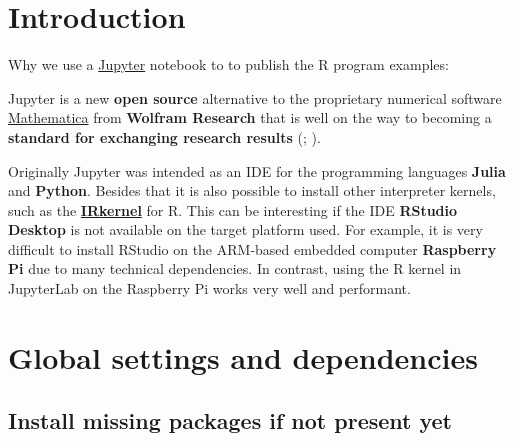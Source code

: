 \documentclass [oneside,10pt,a4paper,ngerman,BCOR10mm,headsepline,parindent,final]{scrartcl}
\begin{document}
    \newpage

    \pagestyle{fancy}
    \fancyhf{}
    \fancyhead[ER,OR]{\leftmark}

    \renewcommand{\sectionmark}[1]{
        \markboth{\thesection{} #1}{}
    }

    
    \tableofcontents
    
    


    
    \hypertarget{introduction}{%
\section{Introduction}\label{introduction}}

Why we use a
\href{https://en.wikipedia.org/wiki/Project_Jupyter}{Jupyter} notebook
to to publish the R program examples:

Jupyter is a new \textbf{open source} alternative to the proprietary
numerical software
\href{https://en.wikipedia.org/wiki/Wolfram_Mathematica}{Mathematica}
from \textbf{Wolfram Research} that is well on the way to becoming a
\textbf{standard for exchanging research results}
(\cite{Scientific_Paper_obsolete_2018};
\cite{Future_of_Research_Paper_2018}).

Originally Jupyter was intended as an IDE for the programming languages
\textbf{Julia} and \textbf{Python}. Besides that it is also possible to
install other interpreter kernels, such as the
\textbf{\href{https://irkernel.github.io/installation/}{IRkernel}} for
R. This can be interesting if the IDE \textbf{RStudio Desktop} is not
available on the target platform used. For example, it is very difficult
to install RStudio on the ARM-based embedded computer \textbf{Raspberry
Pi} due to many technical dependencies. In contrast, using the R kernel
in JupyterLab on the Raspberry Pi works very well and performant.

    \hypertarget{global-settings-and-dependencies}{%
\section{Global settings and
dependencies}\label{global-settings-and-dependencies}}

\hypertarget{install-missing-packages-if-not-present-yet}{%
\subsection{Install missing packages if not present
yet}\label{install-missing-packages-if-not-present-yet}}
\end{document}
